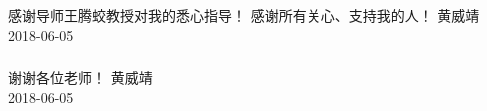 {

\begin{frame}[plain]
\frametitle{}
{\color{white}感谢导师王腾蛟教授对我的悉心指导！}
\vfill
{\color{white}感谢所有关心、支持我的人！}
\vfill
{\color{white}黄威靖\\ 2018-06-05}
\end{frame}
}


{

\begin{frame}[plain]
\frametitle{}
{\color{white}谢谢各位老师！}
\vfill
{\color{white}黄威靖\\ 2018-06-05}
\end{frame}
}
